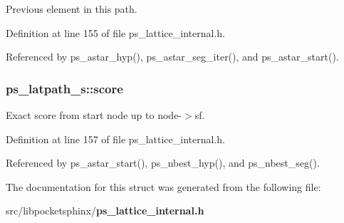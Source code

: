 \-Previous element in this path. 



\-Definition at line 155 of file ps\-\_\-lattice\-\_\-internal.\-h.



\-Referenced by ps\-\_\-astar\-\_\-hyp(), ps\-\_\-astar\-\_\-seg\-\_\-iter(), and ps\-\_\-astar\-\_\-start().

\subsubsection[{score}]{ {\bf ps\-\_\-latpath\-\_\-s\-::score}}\label{structps__latpath__s_a9249fb528f754db992df1d494a69b580}


\-Exact score from start node up to node-\/$>$sf. 



\-Definition at line 157 of file ps\-\_\-lattice\-\_\-internal.\-h.



\-Referenced by ps\-\_\-astar\-\_\-start(), ps\-\_\-nbest\-\_\-hyp(), and ps\-\_\-nbest\-\_\-seg().



\-The documentation for this struct was generated from the following file\-:\begin{DoxyCompactItemize}
\item 
src/libpocketsphinx/{\bf ps\-\_\-lattice\-\_\-internal.\-h}\end{DoxyCompactItemize}
